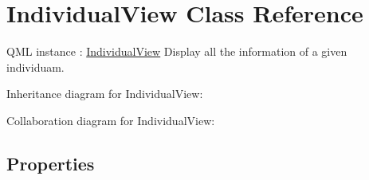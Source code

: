 \hypertarget{class_individual_view}{}\section{Individual\+View Class Reference}
\label{class_individual_view}


Q\+ML instance \+: \hyperlink{class_individual_view}{Individual\+View} Display all the information of a given individuam.  




Inheritance diagram for Individual\+View\+:


Collaboration diagram for Individual\+View\+:
\subsection*{Properties}
